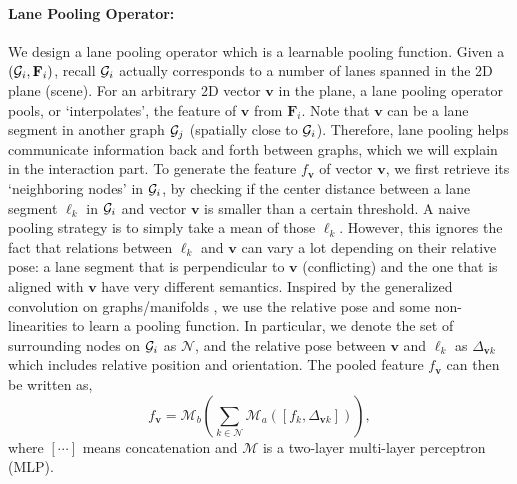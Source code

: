 \paragraph{Lane Pooling Operator:}
We design a lane pooling operator which is a learnable pooling function. Given a \ROI
$(\mathcal{G}_i, \mathbf{F}_i)$, recall $\mathcal{G}_i$ actually corresponds to a number of
lanes spanned in the 2D plane (scene). For an arbitrary 2D vector
$\mathbf{v}$ in the plane, a lane pooling operator pools, or `interpolates',
the feature of $\mathbf{v}$ from $\mathbf{F}_i$. Note that
$\mathbf{v}$ can be a lane segment in another graph $\mathcal{G}_j$ (spatially
close to $\mathcal{G}_i$). Therefore, lane pooling helps
communicate information back and forth between graphs, which we will explain in the interaction part.
To generate the feature $f_\mathbf{v}$ of vector $\mathbf{v}$, we first retrieve
its `neighboring nodes' in $\mathcal{G}_i$, by checking if the center distance between a lane segment
$\ell_k$ in $\mathcal{G}_i$ and vector $\mathbf{v}$ is smaller than a certain threshold. A naive
pooling strategy is to simply take a mean of those $\ell_k$. However, this
ignores the fact that relations between $\ell_k$ and $\mathbf{v}$ can vary a lot
depending on their relative pose: a lane segment that is perpendicular to
$\mathbf{v}$ (conflicting) and the one that is aligned with $\mathbf{v}$
have very different semantics. Inspired by the generalized convolution on graphs/manifolds
\cite{monti2017geometric, contconv, lgn}, we use the relative pose and some non-linearities to
learn a pooling function. In particular, we denote the set of surrounding
nodes on $\mathcal{G}_i$ as $\mathcal{N}$, and the relative pose between $\mathbf{v}$ and
$\ell_k$ as $\Delta_{\mathbf{v}k}$ which includes relative position and
orientation. The pooled feature $f_{\mathbf{v}}$ can then be written as,
\begin{equation}
  \label{eq:pool}
  f_{\mathbf{v}} = \mathcal{M}_b\left(\sum_{k\in \mathcal{N}}
    \mathcal{M}_a\left(\left[
        f_k, \Delta_{\mathbf{v}k}
\right]\right)\right),
\end{equation}
where $[\cdots]$ means concatenation and $\mathcal{M}$
is a two-layer multi-layer perceptron (MLP).



